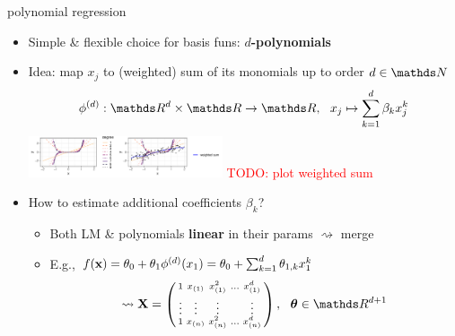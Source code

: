 \documentclass[11pt,compress,t,notes=noshow, xcolor=table]{beamer}
\begin{document}
\begin{frame}{polynomial regression}

\begin{itemize}
    \item Simple \& flexible choice for basis funs: \textbf{$d$-polynomials}
    \item Idea: map $x_j$ to (weighted) sum of its monomials up to order 
    $d \in \N$
    $$ \phi^{(d)}: \R^d \times \R \rightarrow \R, ~~
    x_j \mapsto \sum_{k = 1}^d \beta_k x_j^k$$
    \includegraphics[width=0.45\textwidth]{figure/reg_poly_basis}
    \textcolor{red}{TODO: plot weighted sum }
    \item How to estimate additional coefficients $\beta_k$? 
    \begin{itemize}
      \item Both LM \& polynomials \textbf{linear} in their params
      $\rightsquigarrow$ merge
      \item E.g.,
      $f(\mathbf{x}) = \theta_0 + \theta_1 \phi^{(d)}(x_1)  =
      \theta_0 + \sum_{k = 1}^d \theta_{1, k} x_1^k$
      $$\rightsquigarrow \Xmat = \left(
      \begin{smallmatrix}
          1 & x_{(1)} & x_{(1)}^2 & \hdots & x_{(1)}^d \\
          \vdots & \vdots & \vdots & & \vdots \\
          1 & x_{(n)} & x_{(n)}^2 & \hdots & x_{(n)}^d \\
      \end{smallmatrix}
      \right),
      ~~ \thetab \in \R^{d + 1}
      $$
    \end{itemize}
\end{itemize}

\end{frame}

\end{document}
